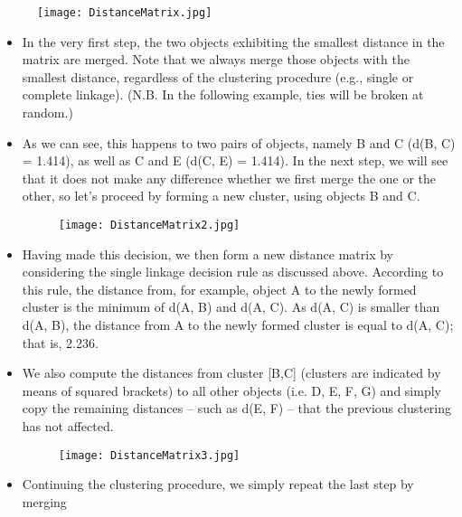 \documentclass[a4paper,12pt]{article}
\begin{document}
\begin{figure}[h!]
\begin{center}
  \texttt{[image: DistanceMatrix.jpg]}\\
\end{center}
\end{figure}

\begin{itemize}
\item In the very first step, the two
objects exhibiting the smallest distance in the matrix are merged. Note that we
always merge those objects with the smallest distance, regardless of the clustering
procedure (e.g., single or complete linkage). (N.B. In the following example, ties will be broken at random.)
\item As we can see, this happens to two
pairs of objects, namely B and C (d(B, C) = 1.414), as well as C and E (d(C, E) =
1.414). In the next step, we will see that it does not make any difference whether we
first merge the one or the other, so let’s proceed by forming a new cluster, using
objects B and C.
\begin{figure}[h!]
\begin{center}
  \texttt{[image: DistanceMatrix2.jpg]}\\
\end{center}
\end{figure}
\item Having made this decision, we then form a new distance matrix by considering
the single linkage decision rule as discussed above. According to this rule, the
distance from, for example, object A to the newly formed cluster is the minimum of
d(A, B) and d(A, C). As d(A, C) is smaller than d(A, B), the distance from A to the
newly formed cluster is equal to d(A, C); that is, 2.236.
\item We also compute the
distances from cluster [B,C] (clusters are indicated by means of squared brackets)
to all other objects (i.e. D, E, F, G) and simply copy the remaining distances – such
as d(E, F) – that the previous clustering has not affected.
\begin{figure}[h!]
\begin{center}
  \texttt{[image: DistanceMatrix3.jpg]}\\
\end{center}
\end{figure}
\item Continuing the clustering procedure, we simply repeat the last step by merging

\end{itemize}
\end{document}
